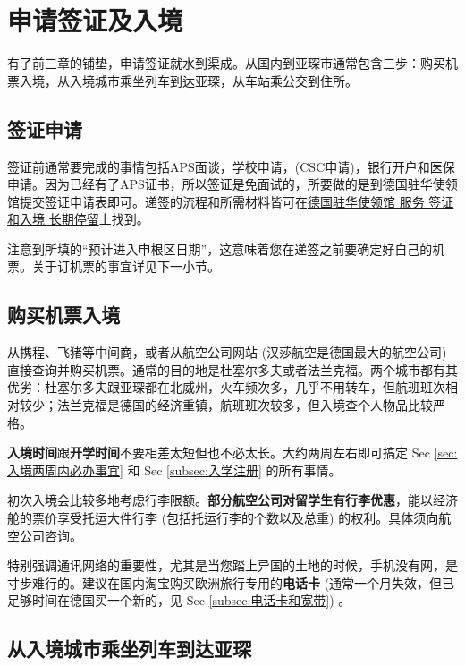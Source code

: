 \section{申请签证及入境}\label{sec:申请签证及入境}

  有了前三章的铺垫，申请签证就水到渠成。从国内到亚琛市通常包含三步：购买机票入境，从入境城市乘坐列车到达亚琛，从车站乘公交到住所。

  \subsection{签证申请}\label{subsec:签证申请}

    签证前通常要完成的事情包括APS面谈，学校申请，(CSC申请)，银行开户和医保申请。因为已经有了APS证书，所以签证是免面试的，所要做的是到德国驻华使领馆提交签证申请表即可。递签的流程和所需材料皆可在\href{https://china.diplo.de/cn-zh/service/visa-einreise/nationales-visum/1345434?openAccordionId=item-1345454-4-panel}{德国驻华使领馆\MVRightarrow{} 服务\MVRightarrow{} 签证和入境\MVRightarrow{} 长期停留}上找到。

    注意到所填的``预计进入申根区日期''，这意味着您在递签之前要确定好自己的机票。关于订机票的事宜详见下一小节。

  \subsection{购买机票入境}\label{subsec:购买机票入境}

    从携程、飞猪等中间商，或者从航空公司网站 (汉莎航空是德国最大的航空公司) 直接查询并购买机票。通常的目的地是杜塞尔多夫或者法兰克福。两个城市都有其优劣：杜塞尔多夫跟亚琛都在北威州，火车频次多，几乎不用转车，但航班班次相对较少；法兰克福是德国的经济重镇，航班班次较多，但入境查个人物品比较严格。

    \textbf{入境时间}跟\textbf{开学时间}不要相差太短但也不必太长。大约两周左右即可搞定 Sec \ref{sec:入境两周内必办事宜} 和 Sec \ref{subsec:入学注册} 的所有事情。

    初次入境会比较多地考虑行李限额。\textbf{部分航空公司对留学生有行李优惠}，能以经济舱的票价享受托运大件行李 (包括托运行李的个数以及总重) 的权利。具体须向航空公司咨询。

    特别强调通讯网络的重要性，尤其是当您踏上异国的土地的时候，手机没有网，是寸步难行的。建议在国内淘宝购买欧洲旅行专用的\textbf{电话卡} (通常一个月失效，但已足够时间在德国买一个新的，见 Sec \ref{subsec:电话卡和宽带}) 。

  \subsection{从入境城市乘坐列车到达亚琛}\label{subsec:从入境城市乘坐列车到达亚琛}

